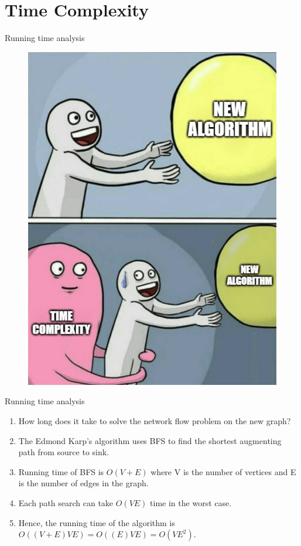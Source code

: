\documentclass{beamer}
\begin{document}
\section{Time Complexity}
\begin{frame}{Running time analysis}
    \begin{figure}[!h]
        \centering
        \includegraphics[scale=0.4]{Images/time complexity.png}
    \end{figure}
\end{frame}
\begin{frame}{Running time analysis}
\begin{enumerate}
  \item<1-> How long does it take to solve the network flow problem on the new graph?
  \pause
  \item<2-> The Edmond Karp's algorithm uses BFS to find the shortest augmenting path from source to sink. 
  \pause
  \item<3-> Running time of BFS is $O(V+E)$ where V is the number of vertices and E is the number of edges in the graph.
  \pause
  \item<4-> Each path search can take $O(VE)$ time in the worst case.
  \pause
  \item <5-> Hence, the running time of the algorithm is $O((V+E)VE) = O((E)VE) = O(VE^{2})$.
\end{enumerate}

\end{frame}
\end{document}
